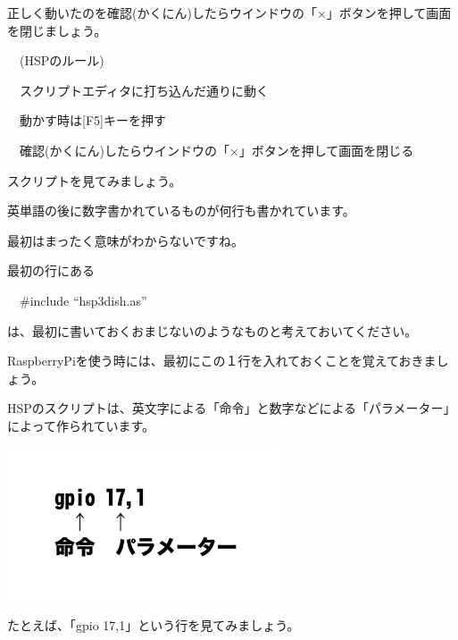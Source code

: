 \documentclass[a4paper,12pt]{jarticle}
\begin{document}
\bigskip
\bigskip
\bigskip

正しく動いたのを確認(かくにん)したらウインドウの「×」ボタンを押して画面を閉じましょう。


\bigskip

\ \ (HSPのルール)


\bigskip

\ \ スクリプトエディタに打ち込んだ通りに動く

\ \ 動かす時は[F5]キーを押す

\ \ 確認(かくにん)したらウインドウの「×」ボタンを押して画面を閉じる


\bigskip

スクリプトを見てみましょう。

英単語の後に数字書かれているものが何行も書かれています。

最初はまったく意味がわからないですね。

\bigskip

最初の行にある


\bigskip

\ \ \#include “hsp3dish.as”


\bigskip

は、最初に書いておくおまじないのようなものと考えておいてください。

RaspberryPiを使う時には、最初にこの１行を入れておくことを覚えておきましょう。


\bigskip

HSPのスクリプトは、英文字による「命令」と数字などによる「パラメーター」によって作られています。

\bigskip
\bigskip

\begin{minipage}{9.781cm}
\centering
{\upshape
\includegraphics[keepaspectratio,width=8.017cm,height=4.512cm]{text02-img/text02-img024.png}}
\end{minipage}

\bigskip
\bigskip
\bigskip

たとえば、「gpio 17,1」という行を見てみましょう。

\bigskip
\end{document}
